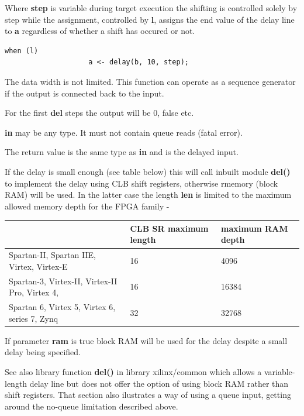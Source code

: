             Where {\bf step} is variable during target execution the shifting
            is controlled solely by step while the assignment, controlled by
            {\bf l}, assigns the end value of the delay line to {\bf a}
            regardless of whether a shift has occured or not.
            \begin{lstlisting}[gobble=12, language=threepl]
                when (l)
                    a <- delay(b, 10, step);
            \end{lstlisting}
            
            The data width is not limited. This function can operate as a
            sequence generator if the output is connected back to the input.
            
            For the first {\bf del} steps the output will be 0, false etc.
            
            {\bf in} may be any type. It must not contain queue reads (fatal
            error).
            
            The return value is the same type as {\bf in} and is the delayed
            input.
            
            If the delay is small enough (see table below) this will call
            inbuilt module {\bf del()}  to implement the
            delay using CLB shift registers, otherwise rmemory (block RAM) will
            be used. In the latter case the length {\bf len} is limited to the
            maximum allowed memory depth for the FPGA family -
            
            \begin{tabular}{| l | l | l |} \hline
                                     &  CLB SR maximum length & maximum RAM depth             \\ \hline \hline
            Spartan-II, Spartan IIE,
            Virtex, Virtex-E         &   16 & 4096 \\ \hline
            Spartan-3, Virtex-II,
            Virtex-II Pro,
            Virtex 4,                &  16 & 16384 \\ \hline
            Spartan 6, Virtex 5,
            Virtex 6, series 7, Zynq &  32 & 32768 \\ \hline
            \end{tabular}

            If parameter {\bf ram} is true block RAM will be used for the
            delay despite a small delay being specified.


            See also library function {\bf del()}  in
            library xilinx/common which allows a variable-length delay line but
            does not offer the option of using block RAM rather than shift
            registers. That section also ilustrates a way of using a queue input,
            getting around the no-queue limitation described above.


